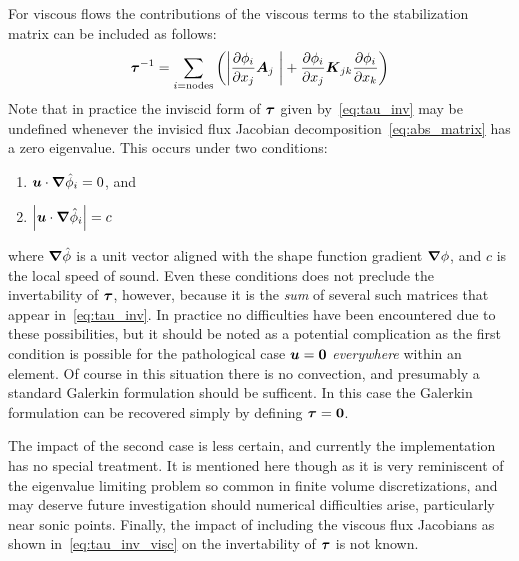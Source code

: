 For viscous flows the contributions of the viscous terms to the stabilization matrix can be included as follows:
\begin{equation}
  {\boldsymbol{\tau}}^{-1} = \sum_{i=\text{nodes}} \left(\left|{\frac{\partial{\phi_i}}{\partial{x_j}}} {\boldsymbol{A}}_j\ \right| + {\frac{\partial{\phi_i}}{\partial{x_j}}} {\boldsymbol{K}}_{jk} {\frac{\partial{\phi_i}}{\partial{x_k}}}\right)
  \label{eq:tau_inv_visc}
\end{equation}
Note that in practice the inviscid form of ${\boldsymbol{\tau}}$ given by~\eqref{eq:tau_inv} may be undefined whenever the invisicd flux Jacobian decomposition~\eqref{eq:abs_matrix} has a zero eigenvalue.  This occurs under two conditions:
\begin{enumerate}
  \item ${\boldsymbol{u}}\cdot{\boldsymbol{\nabla}} {\hat{\phi}}_i=0$, and 
  \item $\left|{\boldsymbol{u}}\cdot{\boldsymbol{\nabla}} {\hat{\phi}}_i\right| = c$
\end{enumerate}
where ${\boldsymbol{\nabla}} {\hat{\phi}}$ is a unit vector aligned with the shape function gradient ${\boldsymbol{\nabla}} {\phi}$, and $c$ is the local speed of sound. Even these conditions does not preclude the invertability of ${\boldsymbol{\tau}}$, however, because it is the \emph{sum} of several such matrices that appear in~\eqref{eq:tau_inv}.  In practice no difficulties have been encountered due to these possibilities, but it should be noted as a potential complication as the first condition is possible for the pathological case ${\boldsymbol{u}}={\boldsymbol{0}}$ \emph{everywhere} within an element.  Of course in this situation there is no convection, and presumably a standard Galerkin formulation should be sufficent.  In this case the Galerkin formulation can be recovered simply by defining ${\boldsymbol{\tau}}={\boldsymbol{0}}$.  

The impact of the second case is less certain, and currently the implementation has no special treatment.  It is mentioned here though as it is very reminiscent of the eigenvalue limiting problem so common in finite volume discretizations, and may deserve future investigation should numerical difficulties arise, particularly near sonic points. Finally, the impact of including the viscous flux Jacobians as shown in~\eqref{eq:tau_inv_visc}  on the invertability of ${\boldsymbol{\tau}}$ is not known.

